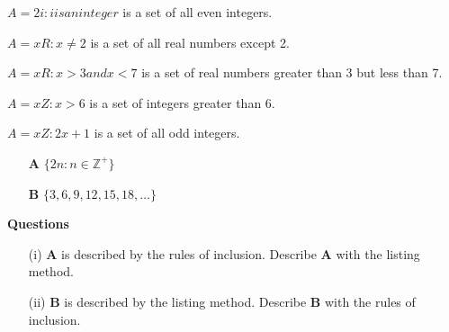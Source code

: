 \documentclass[12pt]{article}
\begin{document}
$A = {2i: i is an integer}$ is a set of all even integers.

$A = {x   R: x \neq 2}$ is a set of all real numbers except 2.

$A = {x   R: x > 3 and x < 7}$ is a set of real numbers greater than 3 but less than 7.

$A = {x   Z: x > 6}$ is a set of integers greater than 6.

$A = {x   Z: 2x + 1}$ is a set of all odd integers.


\begin{itemize}
\item[\textbf{A}] $ \{ 2n : n \in \mathbb{Z^{+}} \} $
\item[\textbf{B}] $ \{ 3,6,9,12,15,18,\ldots \} $
\end{itemize}
\textbf{Questions}
\begin{itemize}
\item[(i)] \textbf{A} is described by the rules of inclusion. Describe \textbf{A} with the listing method.
\item[(ii)] \textbf{B} is described by the listing method. Describe \textbf{B} with the rules of inclusion. 
\end{itemize}
\end{document}
